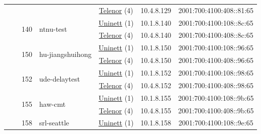 \begin{small}
\begin{center}
\begin{longtable}{|c|c|c|c|c|c|c|c|}
  &  &  &  & \multicolumn{2}{|c|}{\tiny{\href{https://www.telenor.no}{Telenor} (4)}} & \tiny{10.4.8.129} & \tiny{2001:700:4100:408::81:65} \\* \cline{3-3}\cline{4-4}\cline{5-5}\cline{6-6}\cline{7-7}\cline{8-8}
  &  & \multirow{2}{*}{\tiny{140}} & \multicolumn{1}{|l|}{\multirow{2}{*}{\tiny{ntnu-test}}} & \multicolumn{2}{|c|}{\tiny{\href{https://www.uninett.no}{Uninett} (1)}} & \tiny{10.1.8.140} & \tiny{2001:700:4100:108::8c:65} \\* \cline{5-5}\cline{6-6}\cline{7-7}\cline{8-8}
  &  &  &  & \multicolumn{2}{|c|}{\tiny{\href{https://www.telenor.no}{Telenor} (4)}} & \tiny{10.4.8.140} & \tiny{2001:700:4100:408::8c:65} \\* \cline{3-3}\cline{4-4}\cline{5-5}\cline{6-6}\cline{7-7}\cline{8-8}
  &  & \multirow{2}{*}{\tiny{150}} & \multicolumn{1}{|l|}{\multirow{2}{*}{\tiny{hu-jiangshuihong}}} & \multicolumn{2}{|c|}{\tiny{\href{https://www.uninett.no}{Uninett} (1)}} & \tiny{10.1.8.150} & \tiny{2001:700:4100:108::96:65} \\* \cline{5-5}\cline{6-6}\cline{7-7}\cline{8-8}
  &  &  &  & \multicolumn{2}{|c|}{\tiny{\href{https://www.telenor.no}{Telenor} (4)}} & \tiny{10.4.8.150} & \tiny{2001:700:4100:408::96:65} \\* \cline{3-3}\cline{4-4}\cline{5-5}\cline{6-6}\cline{7-7}\cline{8-8}
  &  & \multirow{2}{*}{\tiny{152}} & \multicolumn{1}{|l|}{\multirow{2}{*}{\tiny{ude-delaytest}}} & \multicolumn{2}{|c|}{\tiny{\href{https://www.uninett.no}{Uninett} (1)}} & \tiny{10.1.8.152} & \tiny{2001:700:4100:108::98:65} \\* \cline{5-5}\cline{6-6}\cline{7-7}\cline{8-8}
  &  &  &  & \multicolumn{2}{|c|}{\tiny{\href{https://www.telenor.no}{Telenor} (4)}} & \tiny{10.4.8.152} & \tiny{2001:700:4100:408::98:65} \\* \cline{3-3}\cline{4-4}\cline{5-5}\cline{6-6}\cline{7-7}\cline{8-8}
  &  & \multirow{2}{*}{\tiny{155}} & \multicolumn{1}{|l|}{\multirow{2}{*}{\tiny{haw-cmt}}} & \multicolumn{2}{|c|}{\tiny{\href{https://www.uninett.no}{Uninett} (1)}} & \tiny{10.1.8.155} & \tiny{2001:700:4100:108::9b:65} \\* \cline{5-5}\cline{6-6}\cline{7-7}\cline{8-8}
  &  &  &  & \multicolumn{2}{|c|}{\tiny{\href{https://www.telenor.no}{Telenor} (4)}} & \tiny{10.4.8.155} & \tiny{2001:700:4100:408::9b:65} \\* \cline{3-3}\cline{4-4}\cline{5-5}\cline{6-6}\cline{7-7}\cline{8-8}
  &  & \multirow{2}{*}{\tiny{158}} & \multicolumn{1}{|l|}{\multirow{2}{*}{\tiny{srl-seattle}}} & \multicolumn{2}{|c|}{\tiny{\href{https://www.uninett.no}{Uninett} (1)}} & \tiny{10.1.8.158} & \tiny{2001:700:4100:108::9e:65} \\* \cline{5-5}\cline{6-6}\cline{7-7}\cline{8-8}

\end{longtable}
\end{center}
\end{small}

